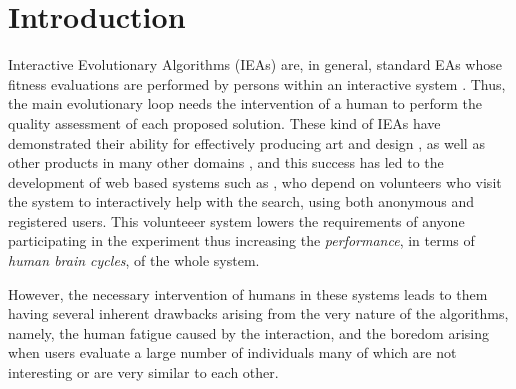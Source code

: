 \documentclass[conference]{IEEEtran}
\begin{document}
\IEEEpeerreviewmaketitle



\section{Introduction}
Interactive Evolutionary Algorithms (IEAs) are, in general, standard EAs whose
fitness evaluations are performed by persons within an interactive 
system \cite{eiben2015interactive}.  Thus, the main evolutionary loop needs the intervention of a
human to perform the quality assessment of each proposed solution.
These kind of IEAs have demonstrated their ability for effectively
producing art and design \cite{Bentley:1999:intro,Sims:1991,todd:1992},
as well as other products in many other domains \cite{ie1}, and this
success has led to the development of web based systems such as \cite{picbreeder},
who depend on volunteers who visit the system to interactively help
with the search, using both anonymous and registered users. This
volunteeer system lowers the requirements of anyone participating in
the experiment thus increasing the {\em performance}, in terms of {\em
  human brain cycles}, of the whole system.


However, the necessary intervention of humans in these systems leads
to them having several inherent drawbacks arising from the very nature of 
the algorithms, namely, the human fatigue caused by the interaction, and
the boredom arising when users evaluate a large number of individuals 
many of which are not interesting or are very similar to each other.
\end{document}

